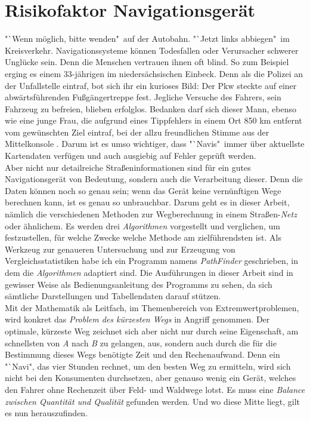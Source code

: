\documentclass[12pt]{article}
\begin{document}
\section{Risikofaktor Navigationsgerät}
"`Wenn möglich, bitte wenden"\ auf der Autobahn. "`Jetzt links abbiegen"\ im Kreisverkehr. Navigationssysteme können Todesfallen oder Verursacher schwerer Unglücke sein. Denn die Menschen vertrauen ihnen oft blind. So zum Beispiel erging es einem 33-jährigen im niedersächsischen Einbeck. Denn als die Polizei an der Unfallstelle eintraf, bot sich ihr ein kurioses Bild: Der Pkw steckte auf einer abwärtsführenden Fußgängertreppe fest. Jegliche Versuche des Fahrers, sein Fahrzeug zu befreien, blieben erfolglos. Bedanken darf sich dieser Mann, ebenso wie eine junge Frau, die aufgrund eines Tippfehlers in einem Ort 850 km entfernt vom gewünschten Ziel eintraf, bei der allzu freundlichen Stimme aus der Mittelkonsole \cite{navi}. Darum ist es umso wichtiger, dass "`Navis"\ immer über aktuellste Kartendaten verfügen und auch ausgiebig auf Fehler geprüft werden. 
\\
Aber nicht nur detailreiche Straßeninformationen sind für ein gutes Navigationsgerät von Bedeutung, sondern auch die Verarbeitung dieser. Denn die Daten können noch so genau sein; wenn das Gerät keine vernünftigen Wege berechnen kann, ist es genau so unbrauchbar. Darum geht es in dieser Arbeit, nämlich die verschiedenen Methoden zur Wegberechnung in einem Straßen-\textit{Netz} oder ähnlichem. Es werden drei \textit{Algorithmen} vorgestellt und verglichen, um festzustellen, für welche Zwecke welche Methode am zielführendsten ist. Als Werkzeug zur genaueren Untersuchung und zur Erzeugung von Vergleichsstatistiken habe ich ein Programm namens \textit{PathFinder} geschrieben, in dem die \textit{Algorithmen} adaptiert sind. Die Ausführungen in dieser Arbeit sind in gewisser Weise als Bedienungsanleitung des Programms zu sehen, da sich sämtliche Darstellungen und Tabellendaten darauf stützen. 
\\
Mit der Mathematik als Leitfach, im Themenbereich von Extremwertproblemen, wird konkret das \textit{Problem des kürzesten Wegs} in Angriff genommen. Der optimale, kürzeste Weg zeichnet sich aber nicht nur durch seine Eigenschaft, am schnellsten von \textit{A} nach \textit{B} zu gelangen, aus, sondern auch durch die für die Bestimmung dieses Wegs benötigte Zeit und den Rechenaufwand. Denn ein "`Navi", das vier Stunden rechnet, um den besten Weg zu ermitteln, wird sich nicht bei den Konsumenten durchsetzen, aber genauso wenig ein Gerät, welches den Fahrer ohne Rechenzeit über Feld- und Waldwege lotst. Es muss eine \textit{Balance zwischen Quantität und Qualität} gefunden werden. Und wo diese Mitte liegt, gilt es nun herauszufinden.
\newpage
\end{document}
